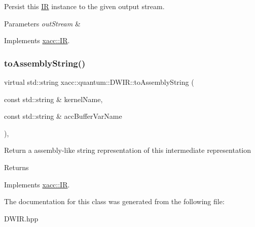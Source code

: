 Persist this \hyperlink{a01175}{IR} instance to the given output stream.


\begin{DoxyParams}{Parameters}
{\em out\+Stream} & \\
\hline
\end{DoxyParams}


Implements \hyperlink{a01175_a414b72224d88473ad6190bb88102a3ea}{xacc\+::\+IR}.

\mbox{\label{a00979_a880cb60197577ea31115331e3a030e3e}} 
\subsubsection{\texorpdfstring{to\+Assembly\+String()}{toAssemblyString()}}
{\footnotesize\ttfamily virtual std\+::string xacc\+::quantum\+::\+D\+W\+I\+R\+::to\+Assembly\+String (\begin{DoxyParamCaption}\item[{const std\+::string \&}]{kernel\+Name,  }\item[{const std\+::string \&}]{acc\+Buffer\+Var\+Name }\end{DoxyParamCaption})\hspace{0.3cm}{\ttfamily [inline]}, {\ttfamily [virtual]}}

Return a assembly-\/like string representation of this intermediate representation \begin{DoxyReturn}{Returns}

\end{DoxyReturn}


Implements \hyperlink{a01175_a8356cdff1919b88eabeb84fd7450cdb6}{xacc\+::\+IR}.



The documentation for this class was generated from the following file\+:\begin{DoxyCompactItemize}
\item 
D\+W\+I\+R.\+hpp\end{DoxyCompactItemize}
